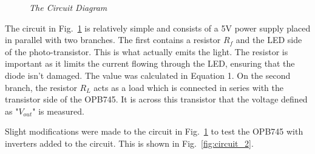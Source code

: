 \documentclass[conference]{IEEEtran}
\begin{document}
\begin{figure}[!ht]
    \centering
    \caption{\textit{The Circuit Diagram}}
    \label{fig:circuit_1}
\end{figure}

The circuit in Fig.~\ref{fig:circuit_1} is relatively simple and consists of a 5V power supply placed in parallel with two branches.
The first contains a resistor $R_f$ and the LED side of the photo-transistor. This is what actually emits the light. The resistor is
important as it limits the current flowing through the LED, ensuring that the diode isn't damaged. The value was calculated in
Equation 1. On the second branch, the resistor $R_L$ acts as a load which is connected in series with the transistor side of the
OPB745. It is across this transistor that the voltage defined as "$V_{out}$" is measured.

Slight modifications were made to the circuit in Fig.~\ref{fig:circuit_1} to test the OPB745 with inverters added to the circuit.
This is shown in Fig.~\ref{fig:circuit_2}.
\end{document}
